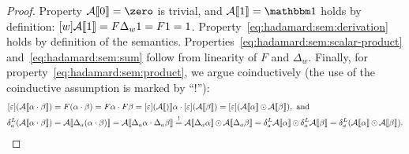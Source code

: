 \begin{proof}
    Property $\Asem \AA 0 = \zero$ is trivial,
    and $\Asem \AA 1 = \one$ holds by definition:
    $[w]\mathcal A\llbracket1\rrbracket = F \Delta_w 1 = F 1 = 1$.
    Property~\cref{eq:hadamard:sem:derivation}
    holds by definition of the semantics.
    Properties~\cref{eq:hadamard:sem:scalar-product} and~\cref{eq:hadamard:sem:sum} follow from linearity of $F$ and $\Delta_w$.
    Finally, for property~\cref{eq:hadamard:sem:product}, we argue coinductively
    (the use of the coinductive assumption is marked by ``!''):
    \begin{align*}
        [\varepsilon]( \mathcal A\llbracket\alpha \cdot \beta\rrbracket)
        &= F (\alpha \cdot \beta)
        = F \alpha \cdot F \beta
        = [\varepsilon](\mathcal A\llbracket)\rrbracket \alpha \cdot [\varepsilon](\mathcal A\llbracket\beta\rrbracket)
        = [\varepsilon](\mathcal A\llbracket\alpha\rrbracket \operatorname{\odot} \mathcal A\llbracket\beta\rrbracket), \text{ and } \\
        \delta^L_{a} (\mathcal A\llbracket\alpha \cdot \beta\rrbracket)
            &= \mathcal A\llbracket\Delta_a (\alpha \cdot \beta)\rrbracket
            = \mathcal A\llbracket\Delta_a \alpha \cdot \Delta_a \beta\rrbracket
            \stackrel ! = \mathcal A\llbracket\Delta_a \alpha\rrbracket \operatorname{\odot} \mathcal A\llbracket\Delta_a \beta\rrbracket
            = \delta^L_{a} \mathcal A\llbracket\alpha\rrbracket \operatorname{\odot} \delta^L_{a} \mathcal A\llbracket\beta\rrbracket
            = \delta^L_{a} (\mathcal A\llbracket\alpha\rrbracket \operatorname{\odot} \mathcal A\llbracket\beta\rrbracket). \qedhere
    \end{align*}
\end{proof}

